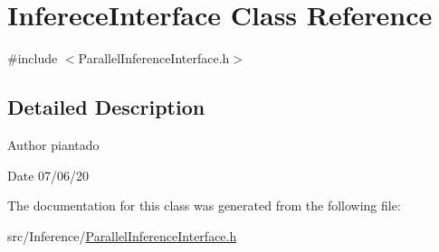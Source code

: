 \hypertarget{class_inferece_interface}{}\section{Inferece\+Interface Class Reference}
\label{class_inferece_interface}


{\ttfamily \#include $<$Parallel\+Inference\+Interface.\+h$>$}



\subsection{Detailed Description}
\begin{DoxyAuthor}{Author}
piantado 
\end{DoxyAuthor}
\begin{DoxyDate}{Date}
07/06/20 
\end{DoxyDate}


The documentation for this class was generated from the following file\+:\begin{DoxyCompactItemize}
\item 
src/\+Inference/\hyperlink{_parallel_inference_interface_8h}{Parallel\+Inference\+Interface.\+h}\end{DoxyCompactItemize}
